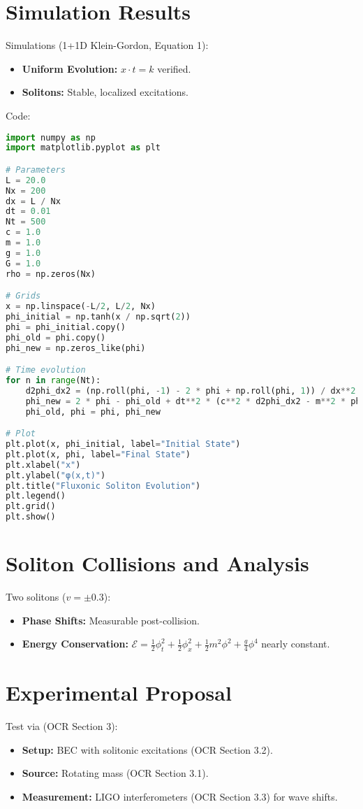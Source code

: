 \documentclass{article}
\begin{document}
\section{Simulation Results}
Simulations (1+1D Klein-Gordon, Equation 1):
\begin{itemize}
    \item \textbf{Uniform Evolution:} \(x \cdot t = k\) verified.
    \item \textbf{Solitons:} Stable, localized excitations.
\end{itemize}
Code:
\begin{lstlisting}[language=Python, caption=Soliton Evolution Simulation, label=lst:soliton]
import numpy as np
import matplotlib.pyplot as plt

# Parameters
L = 20.0
Nx = 200
dx = L / Nx
dt = 0.01
Nt = 500
c = 1.0
m = 1.0
g = 1.0
G = 1.0
rho = np.zeros(Nx)

# Grids
x = np.linspace(-L/2, L/2, Nx)
phi_initial = np.tanh(x / np.sqrt(2))
phi = phi_initial.copy()
phi_old = phi.copy()
phi_new = np.zeros_like(phi)

# Time evolution
for n in range(Nt):
    d2phi_dx2 = (np.roll(phi, -1) - 2 * phi + np.roll(phi, 1)) / dx**2  # Periodic boundaries
    phi_new = 2 * phi - phi_old + dt**2 * (c**2 * d2phi_dx2 - m**2 * phi - g * phi**3 + 8 * np.pi * G * rho)
    phi_old, phi = phi, phi_new

# Plot
plt.plot(x, phi_initial, label="Initial State")
plt.plot(x, phi, label="Final State")
plt.xlabel("x")
plt.ylabel("φ(x,t)")
plt.title("Fluxonic Soliton Evolution")
plt.legend()
plt.grid()
plt.show()
\end{lstlisting}

\section{Soliton Collisions and Analysis}
Two solitons (\(v = \pm 0.3\)):
\begin{itemize}
    \item \textbf{Phase Shifts:} Measurable post-collision.
    \item \textbf{Energy Conservation:} \(\mathcal{E} = \frac{1}{2}\phi_t^2 + \frac{1}{2}\phi_x^2 + \frac{1}{2}m^2\phi^2 + \frac{g}{4}\phi^4\) nearly constant.
\end{itemize}

\section{Experimental Proposal}
Test via (OCR Section 3):
\begin{itemize}
    \item \textbf{Setup:} BEC with solitonic excitations (OCR Section 3.2).
    \item \textbf{Source:} Rotating mass (OCR Section 3.1).
    \item \textbf{Measurement:} LIGO interferometers (OCR Section 3.3) for wave shifts.
\end{itemize}
\end{document}
